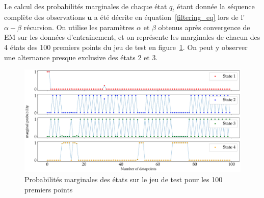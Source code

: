 \documentclass[12pt,a4paper,onecolumn]{article}
\begin{document}
\subsection{}

Le calcul des probabilités marginales de chaque état \(q_t\) étant donnée la séquence complète des observations \(\bm{u}\) a été décrite en équation~\eqref{filtering_eq} lors de l'\(\alpha-\beta\) récursion. On utilise les paramètres \(\alpha\) et \(\beta\) obtenus après convergence de EM sur les données d'entrainement, et on représente les marginales de chacun des 4 états des 100 premiers points du jeu de test en figure~\ref{fig_9_filtering}. On peut y observer une alternance presque exclusive des états 2 et 3.

\begin{figure}[H]
	\centering
	\includegraphics[width = 1.0\textwidth]{9_filtering}
	\caption{Probabilités marginales des états sur le jeu de test pour les 100 premiers points}
	\label{fig_9_filtering}
\end{figure}
\end{document}

